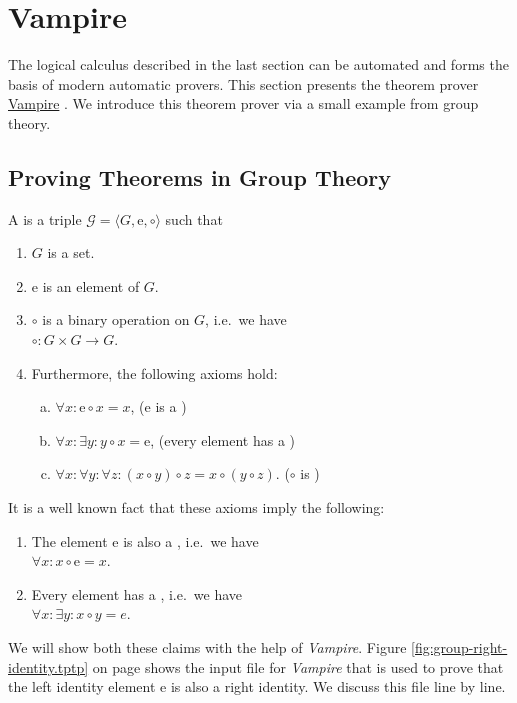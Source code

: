 \section{Vampire }
The logical calculus described in the last section can be automated and forms the basis of modern
automatic provers.  This section presents the theorem prover \href{https://vprover.github.io}{Vampire}
\cite{kovacs:2013}.  We introduce this theorem prover via a small example from group theory.

\subsection{Proving Theorems in Group Theory}
A  is a triple $\mathcal{G} = \langle G, \mathrm{e}, \circ \rangle$
such that
\begin{enumerate}
\item $G$ is a set.
\item $\mathrm{e}$ is an element of $G$.
\item $\circ$ is a binary operation on $G$, i.e.~we have
      \\[0.2cm]
      \hspace*{1.3cm}
      $\circ: G \times G \rightarrow G$.
\item Furthermore, the following axioms hold:
      \begin{enumerate}[(a)]
      \item $\forall x: \mathrm{e} \circ x = x$, \hspace*{\fill} ($\mathrm{e}$ is a )
      \item $\forall x: \exists y: y \circ x = \mathrm{e}$, \hspace*{\fill} (every element has a ) 
      \item $\forall x: \forall y: \forall z: (x \circ y) \circ z = x \circ (y \circ z)$. \hspace*{\fill} ($\circ$ is )
      \end{enumerate}
\end{enumerate}
It is a well known fact that these axioms imply the following:
\begin{enumerate}
\item The element $\mathrm{e}$ is also a , i.e.~we have
      \\[0.2cm]
      \hspace*{1.3cm}
      $\forall x: x \circ \mathrm{e} = x$.
\item Every element has a , i.e.~we have
      \\[0.2cm]
      \hspace*{1.3cm}
      $\forall x: \exists y: x \circ y = e$.
\end{enumerate}
We will show both these claims with the help of \textsl{Vampire}.  Figure \ref{fig:group-right-identity.tptp} on page
\pageref{fig:group-right-identity.tptp} shows the input file for \textsl{Vampire} that is used to prove that
the left identity element $\mathrm{e}$ is also a right identity.  We discuss this file line by line.

